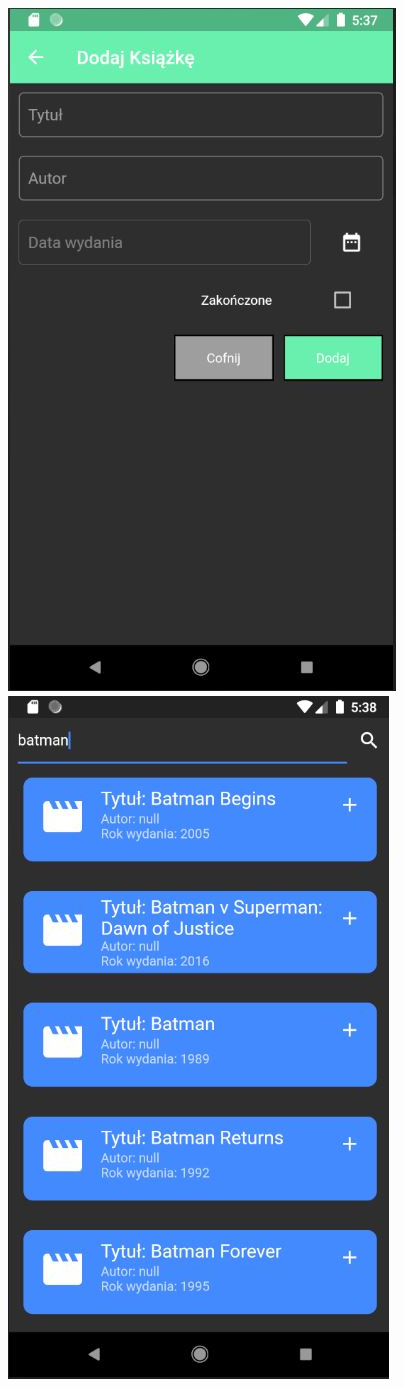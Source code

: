 \documentclass[12pt,a4paper]{article}
\begin{document}
    \begin{center}
        \includegraphics[scale=0.70]{5.JPG}
        \includegraphics[scale=0.70]{6.JPG}

\end{center}
\end{document}
